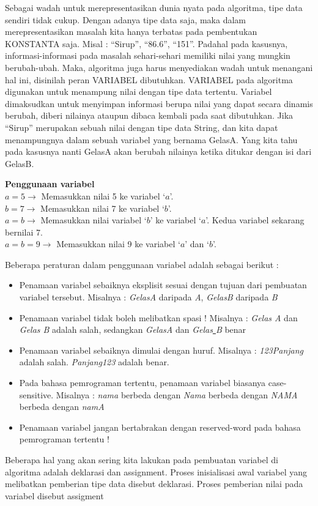 Sebagai wadah untuk merepresentasikan dunia nyata pada algoritma, tipe data sendiri tidak cukup. Dengan adanya tipe data saja, maka dalam merepresentasikan masalah kita hanya terbatas pada pembentukan KONSTANTA saja. Misal : “Sirup”, “86.6”, “151”.  Padahal pada kasusnya, informasi-informasi pada masalah sehari-sehari memiliki nilai yang mungkin berubah-ubah. Maka, algoritma juga harus menyediakan wadah untuk menangani hal ini,  disinilah peran VARIABEL dibutuhkan. 
	VARIABEL pada algoritma digunakan untuk menampung nilai dengan tipe data tertentu. Variabel dimaksudkan untuk menyimpan informasi berupa nilai yang dapat secara dinamis berubah, diberi nilainya ataupun dibaca kembali pada saat dibutuhkan. Jika “Sirup” merupakan sebuah nilai dengan tipe data String, dan kita dapat menampungnya dalam sebuah variabel yang bernama GelasA. Yang kita tahu pada kasusnya nanti GelasA akan berubah nilainya ketika ditukar dengan isi dari GelasB.
\begin{contoh}
	\textbf{Penggunaan variabel}\\
	$a = 5 \rightarrow$ Memasukkan nilai 5 ke variabel `$a$'.\\
	$b = 7 \rightarrow$ Memasukkan nilai 7 ke variabel `$b$'.\\
	$a = b \rightarrow$ Memasukkan nilai variabel `$b$' ke variabel `$a$'. Kedua variabel sekarang bernilai 7.\\
	$a = b = 9 \rightarrow$ Memasukkan nilai 9 ke variabel `$a$' dan `$b$'.\\
\end{contoh}

Beberapa peraturan dalam penggunaan variabel adalah sebagai berikut : 
\begin{itemize}
	\item Penamaan variabel sebaiknya eksplisit sesuai dengan tujuan dari pembuatan variabel tersebut. 			  Misalnya : \textit{GelasA} daripada \textit{A}, \textit{GelasB} daripada \textit{B}
	\item	Penamaan variabel tidak boleh melibatkan spasi !  Misalnya : \textit{Gelas A} dan \textit{Gelas B} adalah salah, sedangkan \textit{GelasA} dan \textit{Gelas\underline{ }B} benar
	\item	Penamaan variabel sebaiknya dimulai dengan huruf. Misalnya : \textit{123Panjang} adalah salah. \textit{Panjang123} adalah benar. 
	\item	Pada bahasa pemrograman tertentu, penamaan variabel biasanya case-sensitive. Misalnya : \textit{nama} berbeda dengan \textit{Nama} berbeda dengan \textit{NAMA} berbeda dengan \textit{namA}
	\item	Penamaan variabel jangan bertabrakan dengan reserved-word pada bahasa pemrograman tertentu !
\end{itemize}
Beberapa hal yang akan sering kita lakukan pada pembuatan variabel di algoritma adalah deklarasi dan assignment. Proses inisialisasi awal variabel yang melibatkan pemberian tipe data disebut deklarasi. Proses pemberian nilai pada variabel disebut assigment 

